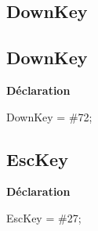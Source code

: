 \documentclass{report}
\newif\ifpdf
\begin{document}
\subsection*{\large{\textbf{DownKey}}\normalsize\hspace{1ex}\hrulefill}
\else
\subsection*{DownKey}
\fi
\label{LesMenus-DownKey}
\begin{list}{}{
\setlength{\itemindent}{0cm}
\setlength{\listparindent}{0cm}
\setlength{\leftmargin}{\evensidemargin}
\addtolength{\leftmargin}{\tmplength}
\settowidth{\labelsep}{X}
\addtolength{\leftmargin}{\labelsep}
\setlength{\labelwidth}{\tmplength}
}
\item[\textbf{Déclaration}\hfill]
\ifpdf
\begin{flushleft}
\fi
\begin{ttfamily}
DownKey = {\#}72;\end{ttfamily}

\ifpdf
\end{flushleft}
\fi

\end{list}
\ifpdf
\subsection*{\large{\textbf{EscKey}}\normalsize\hspace{1ex}\hrulefill}
\else
\subsection*{EscKey}
\fi
\label{LesMenus-EscKey}
\begin{list}{}{
\setlength{\itemindent}{0cm}
\setlength{\listparindent}{0cm}
\setlength{\leftmargin}{\evensidemargin}
\addtolength{\leftmargin}{\tmplength}
\settowidth{\labelsep}{X}
\addtolength{\leftmargin}{\labelsep}
\setlength{\labelwidth}{\tmplength}
}
\item[\textbf{Déclaration}\hfill]
\ifpdf
\begin{flushleft}
\fi
\begin{ttfamily}
EscKey = {\#}27;\end{ttfamily}

\ifpdf
\end{flushleft}
\fi

\end{list}
\ifpdf
\end{document}
